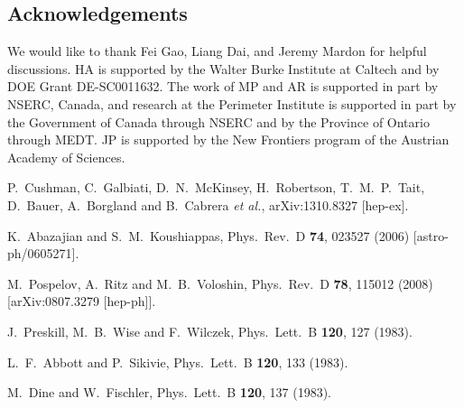 \documentclass[prd,reprint,nofootinbib,notitlepage,aps,tightenlines,preprintnumbers,amsmath,amssymb,showpacs,superscriptaddress]{revtex4-1}
\begin{document}
\subsection*{Acknowledgements}

We would like to thank Fei Gao, Liang Dai, and Jeremy Mardon for helpful
discussions. HA is supported by the Walter Burke Institute at Caltech
and by DOE Grant DE-SC0011632. The work of MP and AR is supported in
part by NSERC, Canada, and research at the Perimeter Institute is
supported in part by the Government of Canada through NSERC and by the
Province of Ontario through MEDT. JP is supported by the New Frontiers
program of the Austrian Academy of Sciences.



\begin{thebibliography}{99}

  P.~Cushman, C.~Galbiati, D.~N.~McKinsey, H.~Robertson, T.~M.~P.~Tait, D.~Bauer, A.~Borgland and B.~Cabrera {\it et al.},
  arXiv:1310.8327 [hep-ex].

  K.~Abazajian and S.~M.~Koushiappas,
  Phys.\ Rev.\ D {\bf 74}, 023527 (2006)
  [astro-ph/0605271].


  M.~Pospelov, A.~Ritz and M.~B.~Voloshin,
  Phys.\ Rev.\ D {\bf 78}, 115012 (2008)
  [arXiv:0807.3279 [hep-ph]].

  J.~Preskill, M.~B.~Wise and F.~Wilczek,
  Phys.\ Lett.\ B {\bf 120}, 127 (1983).


  L.~F.~Abbott and P.~Sikivie,
  Phys.\ Lett.\ B {\bf 120}, 133 (1983).


  M.~Dine and W.~Fischler,
  Phys.\ Lett.\ B {\bf 120}, 137 (1983).




\end{thebibliography}
\end{document}

